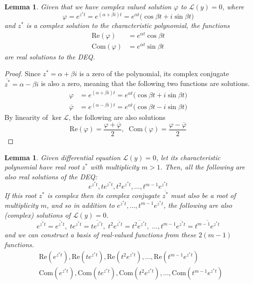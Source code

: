 \documentclass{article}
\newtheorem{lemma}[theorem]{Lemma}
\theoremstyle{remark}
\theoremstyle{definition}
\begin{document}
      \begin{lemma}
      Given that we have complex valued solution $\varphi$ to $\mathcal{L}(y) = 0$, where
      \[\varphi = e^{z^* t} = e^{(\alpha + \beta i) t} = e^{\alpha t} \big(\cos{\beta t} + i \sin{\beta t}\big)\]
      and $z^*$ is a complex solution to the characteristic polynomial, the functions 
      \begin{align*}
          \text{Re}(\varphi) & = e^{\alpha t} \cos{\beta t} \\
          \text{Com}(\varphi) & = e^{\alpha t} \sin{\beta t} 
      \end{align*}
      are real solutions to the DEQ. 
      \end{lemma}
      \begin{proof}
      Since $z^* = \alpha + \beta i$ is a zero of the polynomial, its complex conjugate $\overline{z^*} = \alpha - \beta i$ is also a zero, meaning that the following two functions are solutions. 
      \begin{align*}
          \varphi & = e^{(\alpha + \beta i)t} = e^{\alpha t} \big( \cos{\beta t} + i \sin{\beta t}\big) \\
          \overline{\varphi} & = e^{(\alpha - \beta i)t} = e^{\alpha t} \big(\cos{\beta t} - i \sin{\beta t}\big) 
      \end{align*}
      By linearity of $\ker{\mathcal{L}}$, the following are also solutions
      \[\text{Re}(\varphi) = \frac{\varphi + \overline{\varphi}}{2}, \;\; \text{Com}(\varphi) = \frac{\varphi - \overline{\varphi}}{2}\]
      \end{proof}

      \begin{lemma}
      Given differential equation $\mathcal{L}(y) = 0$, let its characteristic polynomial have real root $z^*$ with multiplicity $m > 1$. Then, all the following are also real solutions of the DEQ:  
      \[e^{z^* t}, t e^{z^* t}, t^2 e^{z^* t}, \ldots, t^{m-1} e^{z^* t}\]
      If this root $z^*$ is complex then its complex conjugate $\overline{z^*}$ must also be a root of multiplicity $m$, and so in addition to $e^{z^* t}, \ldots, t^{m-1} e^{z^* t}$, the following are also (complex) solutions of $\mathcal{L}(y) = 0$. 
      \[e^{\overline{z^*} t} = \overline{e^{z^* t}}, \; t e^{\overline{z^*} t} = \overline{t e^{z^* t}}, \; t^2 e^{\overline{z^*} t} = \overline{t^2 e^{z^* t}}, \; \ldots, t^{m-1} e^{\overline{z^*} t} = \overline{t^{m-1} e^{z^* t}}\]
      and we can construct a basis of real-valued functions from these $2 (m-1)$ functions. 
      \begin{align*}
          &\text{Re}(e^{z^* t}), \text{Re}(t e^{z^* t}), \text{Re}(t^2 e^{z^* t}), \ldots,  \text{Re}(t^{m-1} e^{z^* t}) \\
          &\text{Com}(e^{z^* t}), \text{Com}(t e^{z^* t}), \text{Com}(t^2 e^{z^* t}), \ldots, \text{Com}(t^{m-1} e^{z^* t})
      \end{align*}
      \end{lemma}
\end{document}
